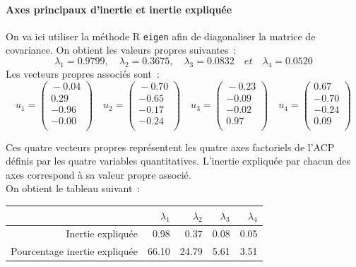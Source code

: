 \documentclass[a4paper,10pt]{report}
\begin{document}
\paragraph{Axes principaux d'inertie et inertie expliquée} On va ici utiliser la méthode R \texttt{eigen} afin de diagonaliser la matrice de covariance.
On obtient les valeurs propres suivantes~:
\[
\lambda_1 = 0.9799,\quad
\lambda_2 = 0.3675,\quad
\lambda_3 = 0.0832 \quad et \quad 
\lambda_4 = 0.0520
\]
Les vecteurs propres associés sont~:
\[u_1 = 
\begin{pmatrix}{}
	-0.04 \\ 
	 0.29 \\ 
	-0.96 \\ 
	-0.00 \\ 
\end{pmatrix}\quad
u_2 = 
\begin{pmatrix}{}
	-0.70 \\ 
	-0.65 \\ 
	-0.17 \\ 
	-0.24 \\ 
\end{pmatrix}\quad
u_3 = 
\begin{pmatrix}{}
	-0.23 \\ 
	-0.09 \\ 
	-0.02 \\ 
 	 0.97 \\ 
\end{pmatrix}\quad
u_4 = 
\begin{pmatrix}{}
	 0.67 \\ 
	-0.70 \\ 
	-0.24 \\ 
	 0.09 \\ 
\end{pmatrix}
\]


Ces quatre vecteurs propres représentent les quatre axes factoriels de l'ACP définis par les quatre variables quantitatives. L'inertie expliquée par chacun des axes correspond à sa valeur propre associé.\\
On obtient le tableau suivant~:
\begin{table}[H]
	\centering
	\begin{tabular}{r|rrrr}
		& $\lambda_1$ & $\lambda_2$ & $\lambda_3$ & $\lambda_4$ \\ 
		\hline
		Inertie expliquée & 0.98 & 0.37 & 0.08 & 0.05 \\ 
		Pourcentage inertie expliquée & 66.10 & 24.79 & 5.61 & 3.51 \\ 
	\end{tabular}
\end{table}
\end{document}
